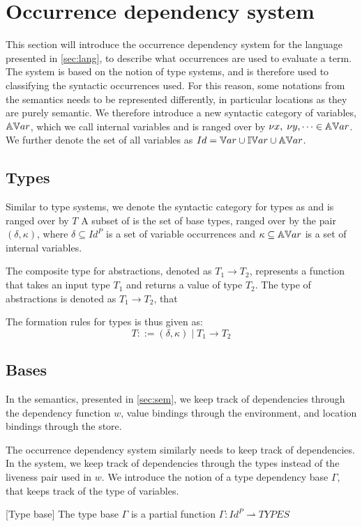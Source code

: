 \documentclass[../../master.tex]{subfiles}
\begin{document}
\section{Occurrence dependency system}
This section will introduce the occurrence dependency system for the language presented in \cref{sec:lang}, to describe what occurrences are used to evaluate a term.
The system is based on the notion of type systems, and is therefore used to classifying the syntactic occurrences used.
For this reason, some notations from the semantics needs to be represented differently, in particular locations as they are purely semantic.
We therefore introduce a new syntactic category of variables, $\mathbb{AV}ar$, which we call internal variables and is ranged over by $\nu x,\;\nu y,\cdots\in\mathbb{AV}ar$.
We further denote the set of all variables as $Id=\mathbb{V}ar\cup\mathbb{IV}ar\cup\mathbb{AV}ar$.

\subsection{Types}
Similar to type systems, we denote the syntactic category for types as  and is ranged over by $T$
A subset of  is the set of base types, ranged over by the pair $(\delta,\kappa)$, where $\delta\subseteq Id^P$ is a set of variable occurrences and $\kappa\subseteq\mathbb{AV}ar$ is a set of internal variables.

The composite type for abstractions, denoted as $T_1\rightarrow T_2$, represents a function that takes an input type $T_1$ and returns a value of type $T_2$.
The type of abstractions is denoted as $T_1\rightarrow T_2$, that 

The formation rules for types is thus given as:
$$T::=(\delta,\kappa)\mid T_1 \rightarrow T_2$$

\subsection{Bases}
In the semantics, presented in \cref{sec:sem}, we keep track of dependencies through the dependency function $w$, value bindings through the environment, and location bindings through the store.

The occurrence dependency system similarly needs to keep track of dependencies.
In the system, we keep track of dependencies through the types instead of the liveness pair used in $w$.
We introduce the notion of a type dependency base $\Gamma$, that keeps track of the type of variables.

\begin{definition}{[Type base]}
	The type base $\Gamma$ is a partial function $\Gamma:Id^P\rightharpoonup TYPES$
\end{definition}
\end{document}
